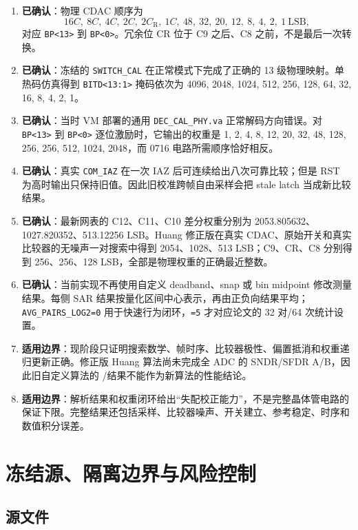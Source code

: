 \documentclass[UTF8,a4paper,11pt]{ctexart}
\newcommand{\confirmed}{\textcolor{confirmed}{\textbf{已确认}}}
\newcommand{\limited}{\textcolor{limited}{\textbf{适用边界}}}
\newcommand{\code}[1]{\texttt{#1}}
\begin{document}
\begin{enumerate}
  \item \confirmed：物理 CDAC 顺序为
  \[
  16C,\ 8C,\ 4C,\ 2C,\ 2C_{\mathrm{R}},\ 1C,\ 48,\ 32,\ 20,\ 12,\ 8,\ 4,\ 2,\ 1\ \mathrm{LSB},
  \]
  对应 \code{BP<13>} 到 \code{BP<0>}。冗余位 CR 位于 C9 之后、C8 之前，不是最后一次转换。
  \item \confirmed：冻结的 \code{SWITCH\_CAL} 在正常模式下完成了正确的 13 级物理映射。单热码仿真得到 \code{BITD<13:1>} 掩码依次为 4096, 2048, 1024, 512, 256, 128, 64, 32, 16, 8, 4, 2, 1。
  \item \confirmed：当时 VM 部署的通用 \code{DEC\_CAL\_PHY.va} 正常解码方向错误。对 \code{BP<13>} 到 \code{BP<0>} 逐位激励时，它输出的权重是 1, 2, 4, 8, 12, 20, 32, 48, 128, 256, 256, 512, 1024, 2048，而 0716 电路所需顺序恰好相反。
  \item \confirmed：真实 \code{COM\_IAZ} 在一次 IAZ 后可连续给出八次可靠比较；但是 RST 为高时输出只保持旧值。因此旧校准跨帧自由采样会把 stale latch 当成新比较结果。
  \item \confirmed：最新网表的 C12、C11、C10 差分权重分别为 2053.805632、1027.820352、513.12256 LSB。Huang 修正版在真实 CDAC、原始开关和真实比较器的无噪声一对搜索中得到 2054、1028、513 LSB；C9、CR、C8 分别得到 256、256、128 LSB，全部是物理权重的正确最近整数。
  \item \confirmed：当前实现不再使用自定义 deadband、snap 或 bin midpoint 修改测量结果。每侧 SAR 结果按量化区间中心表示，再由正负向结果平均；\code{AVG\_PAIRS\_LOG2=0} 用于快速行为闭环，\code{=5} 才对应论文的 32 对/64 次统计设置。
  \item \limited：现阶段只证明搜索数学、帧时序、比较器极性、偏置抵消和权重递归更新正确。修正版 Huang 算法尚未完成全 ADC 的 SNDR/SFDR A/B，因此旧自定义算法的 \BaselineSNDR/\CalibratedSNDR 结果不能作为新算法的性能结论。
  \item \limited：解析结果和权重闭环给出“失配校正能力”，不是完整晶体管电路的保证下限。完整结果还包括采样、比较器噪声、开关建立、参考稳定、时序和数值积分误差。
\end{enumerate}

\section{冻结源、隔离边界与风险控制}

\subsection{源文件}
\end{document}
